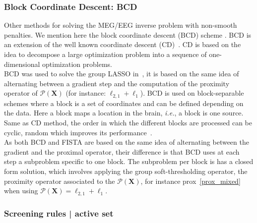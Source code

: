 

\subsubsection*{Block Coordinate Descent: BCD}
Other methods for solving the MEG/EEG inverse problem with non-smooth penalties. We mention here the block coordinate descent (BCD) scheme \cite{tseng2010approximation}. BCD is an extension of the well known coordinate descent (CD)~\cite{li-osher:2009,nesterov2012efficiency}. CD is based on the idea to decompose a large optimization problem into a sequence of one-dimensional optimization problems. \\

BCD was used to solve the group LASSO in~\cite{rakotomamonjy2011surveying,qin2013efficient}, it is based on the same idea of alternating between a gradient step and the computation of the proximity operator of $\mathcal{P}(\mathbf{X})$ (for instance: $\ell_{2,1}+\ell_1$). BCD is used on block-separable schemes where a block is a set of coordinates and can be defined depending on the data. Here a block maps a location in the brain, \textit{i.e.}, a block is one source. Same as CD method, the order in which the different blocks are processed can be cyclic, random which improves its performance~\cite{tseng2001convergence,wei2012doa}. \\

As both BCD and FISTA are based on the same idea of alternating between the gradient and the proximal operator, their difference is that BCD uses at each step a subproblem specific to one block. The subproblem per block is has a closed form solution, which involves applying the group soft-thresholding operator, the proximity operator associated to the $\mathcal{P}(\mathbf{X})$, for instance prox~\ref{prox_mixed} when using $\mathcal{P}(\mathbf{X}) = \ell_{2,1}+\ell_1$.

\subsubsection*{Screening rules | active set}

